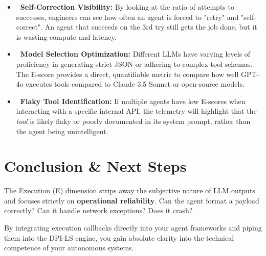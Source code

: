 \documentclass[11pt,a4paper]{article}
\begin{document}
\begin{itemize}
    \item \textbf{\color{dpiblue}\faChartBar\ Self-Correction Visibility:} By looking at the ratio of attempts to successes, engineers can see how often an agent is forced to "retry" and "self-correct". An agent that succeeds on the 3rd try still gets the job done, but it is wasting compute and latency.
    \item \textbf{\color{dpigreen}\faBrain\ Model Selection Optimization:} Different LLMs have varying levels of proficiency in generating strict JSON or adhering to complex tool schemas. The E-score provides a direct, quantifiable metric to compare how well GPT-4o executes tools compared to Claude 3.5 Sonnet or open-source models.
    \item \textbf{\color{dpired}\faTools\ Flaky Tool Identification:} If multiple agents have low E-scores when interacting with a specific internal API, the telemetry will highlight that the \textit{tool} is likely flaky or poorly documented in its system prompt, rather than the agent being unintelligent.
\end{itemize}

\vspace{0.5cm}

\section{Conclusion \& Next Steps}

\begin{dpiimportant}
The Execution (E) dimension strips away the subjective nature of LLM outputs and focuses strictly on \textbf{operational reliability}. Can the agent format a payload correctly? Can it handle network exceptions? Does it crash?
\end{dpiimportant}

By integrating execution callbacks directly into your agent frameworks and piping them into the DPI-LS engine, you gain absolute clarity into the technical competence of your autonomous systems.
\end{document}

